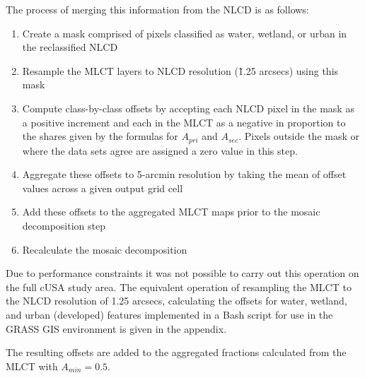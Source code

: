 The process of merging this information from the NLCD is as follows:

\begin{enumerate}
  \item Create a mask comprised of pixels classified as water, wetland,
    or urban in the reclassified NLCD
  \item Resample the MLCT layers to NLCD resolution (\~1.25 arcsecs)
    using this mask
  \item Compute class-by-class offsets by accepting each NLCD pixel in
    the mask as a positive increment and each in the MLCT as a negative
    in proportion to the shares given by the formulas for $A_{pri}$ and
    $A_{sec}$.  Pixels outside the mask or where the data sets agree are
    assigned a zero value in this step.
  \item Aggregate these offsets to 5-arcmin resolution by taking the
    mean of offset values across a given output grid cell
  \item Add these offsets to the aggregated MLCT maps prior to the
    mosaic decomposition step
  \item Recalculate the mosaic decomposition
\end{enumerate}












Due to performance constraints it was not possible to carry out this
operation on the full cUSA study area.  The equivalent operation of
resampling the MLCT to the NLCD resolution of 1.25 arcsecs,
calculating the offsets for water, wetland, and urban (developed)
features implemented in a Bash script for use in the GRASS GIS
environment is given in the appendix.



The resulting offsets are added to the aggregated fractions calculated
from the MLCT with $A_{min}=0.5$.  








